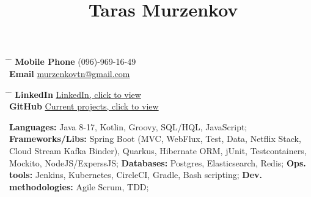 \documentclass[10pt]{article} %
\begin{document}


\title{Taras Murzenkov } %


\parbox{0.2\textwidth}{ %
\begin{tabbing} %
\hspace{3cm} \= \hspace{4cm} \= \kill %
{\bf Mobile Phone} \> (096)-969-16-49\\ %
{\bf Email} \> \href{mailto:murzenkovtn@gmail.com}{murzenkovtn@gmail.com} \\ %

\end{tabbing}}
\hfill %
\parbox{0.5\textwidth}{ %
\begin{tabbing} %
\hspace{3cm} \= \hspace{4cm} \= \kill %
{\bf LinkedIn} \> \href{https://www.linkedin.com/in/tarasmurzenkov}{LinkedIn, click to view} \\ %
{\bf GitHub} \> \href{https://github.com/tarasmurzenkovv/}{Current projects, click to view}\\ %

\end{tabbing}}

{
\textbf{Languages:} Java 8-17, Kotlin, Groovy, SQL/HQL, JavaScript; \newline
\textbf{Frameworks/Libs:} Spring Boot (MVC, WebFlux, Test, Data, Netflix Stack, Cloud Stream Kafka Binder), Quarkus, Hibernate ORM, jUnit, Testcontainers, Mockito, NodeJS/ExperssJS; \newline
\textbf{Databases:}  Postgres, Elasticsearch, Redis; \newline
\textbf{Ops. tools:} Jenkins, Kubernetes, CircleCI, Gradle, Bash scripting; \newline
\textbf{Dev. methodologies:} Agile Scrum, TDD;
}
\end{document}

